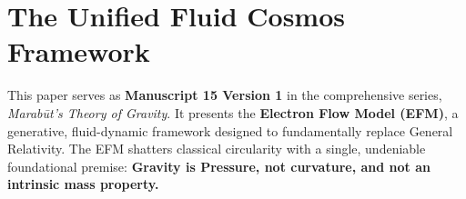 \documentclass[11pt, a4paper]{article}
\begin{document}
\clearpage
\section*{The Unified Fluid Cosmos Framework}
  This paper serves as \textbf{Manuscript 15 Version 1} in the comprehensive series, \textit{Marab\={u}t's Theory of Gravity}. It presents the \textbf{Electron Flow Model (EFM)}, a generative, fluid-dynamic framework designed to fundamentally replace General Relativity. The EFM shatters classical circularity with a single, undeniable foundational premise: \textbf{Gravity is Pressure, not curvature, and not an intrinsic mass property.}
\end{document}
